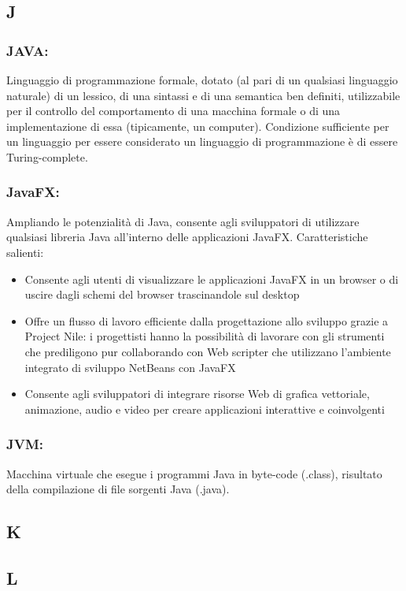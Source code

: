 \subsection*{\huge{J}}
\subsubsection*{JAVA:} Linguaggio di programmazione formale, dotato (al pari di
un qualsiasi linguaggio naturale) di un lessico, di una sintassi e di una semantica ben
definiti, utilizzabile per il controllo del comportamento di una macchina
formale o di una implementazione di essa (tipicamente, un computer). Condizione
sufficiente per un linguaggio per essere considerato un linguaggio di
programmazione \`e di essere Turing-complete.

\subsubsection*{JavaFX:} Ampliando le potenzialit\`a di Java, consente agli
sviluppatori di utilizzare qualsiasi libreria Java all'interno delle applicazioni JavaFX.
Caratteristiche salienti:
\begin{itemize}
\item Consente agli utenti di visualizzare le applicazioni JavaFX in un browser
o di uscire dagli schemi del browser trascinandole sul desktop 
\item Offre un flusso di lavoro efficiente dalla progettazione allo sviluppo
grazie a Project Nile: i progettisti hanno la possibilit\`a di lavorare con gli strumenti
che prediligono pur collaborando con Web scripter che utilizzano l'ambiente
integrato di sviluppo NetBeans con JavaFX
\item Consente agli sviluppatori di integrare risorse Web di grafica vettoriale,
animazione, audio e video per creare applicazioni interattive e coinvolgenti
\end{itemize}

\subsubsection*{JVM:} Macchina virtuale che esegue i programmi Java in byte-code
(.class), risultato della compilazione di file sorgenti Java (.java).

\subsection*{\huge{K}}
\subsection*{\huge{L}}
